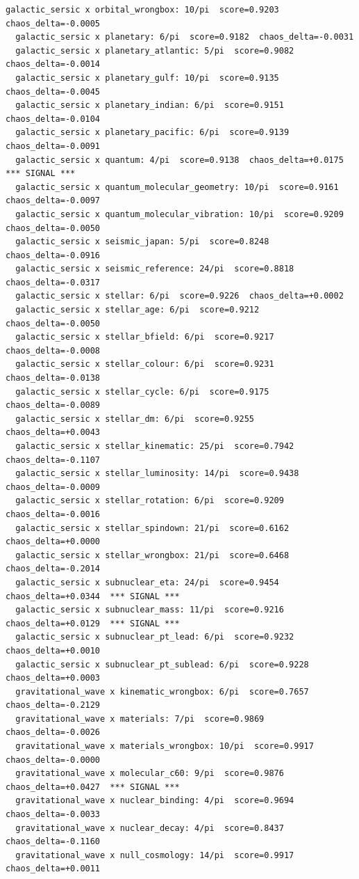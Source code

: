 \documentclass[11pt, letterpaper, openany]{book}
\begin{document}
\begin{empiricalbox}
\begin{lstlisting}[style=terminal]
  galactic_sersic x orbital_wrongbox: 10/pi  score=0.9203  chaos_delta=-0.0005
  galactic_sersic x planetary: 6/pi  score=0.9182  chaos_delta=-0.0031
  galactic_sersic x planetary_atlantic: 5/pi  score=0.9082  chaos_delta=-0.0014
  galactic_sersic x planetary_gulf: 10/pi  score=0.9135  chaos_delta=-0.0045
  galactic_sersic x planetary_indian: 6/pi  score=0.9151  chaos_delta=-0.0104
  galactic_sersic x planetary_pacific: 6/pi  score=0.9139  chaos_delta=-0.0091
  galactic_sersic x quantum: 4/pi  score=0.9138  chaos_delta=+0.0175  *** SIGNAL ***
  galactic_sersic x quantum_molecular_geometry: 10/pi  score=0.9161  chaos_delta=-0.0097
  galactic_sersic x quantum_molecular_vibration: 10/pi  score=0.9209  chaos_delta=-0.0050
  galactic_sersic x seismic_japan: 5/pi  score=0.8248  chaos_delta=-0.0916
  galactic_sersic x seismic_reference: 24/pi  score=0.8818  chaos_delta=-0.0317
  galactic_sersic x stellar: 6/pi  score=0.9226  chaos_delta=+0.0002
  galactic_sersic x stellar_age: 6/pi  score=0.9212  chaos_delta=-0.0050
  galactic_sersic x stellar_bfield: 6/pi  score=0.9217  chaos_delta=-0.0008
  galactic_sersic x stellar_colour: 6/pi  score=0.9231  chaos_delta=-0.0138
  galactic_sersic x stellar_cycle: 6/pi  score=0.9175  chaos_delta=-0.0089
  galactic_sersic x stellar_dm: 6/pi  score=0.9255  chaos_delta=+0.0043
  galactic_sersic x stellar_kinematic: 25/pi  score=0.7942  chaos_delta=-0.1107
  galactic_sersic x stellar_luminosity: 14/pi  score=0.9438  chaos_delta=-0.0009
  galactic_sersic x stellar_rotation: 6/pi  score=0.9209  chaos_delta=-0.0016
  galactic_sersic x stellar_spindown: 21/pi  score=0.6162  chaos_delta=+0.0000
  galactic_sersic x stellar_wrongbox: 21/pi  score=0.6468  chaos_delta=-0.2014
  galactic_sersic x subnuclear_eta: 24/pi  score=0.9454  chaos_delta=+0.0344  *** SIGNAL ***
  galactic_sersic x subnuclear_mass: 11/pi  score=0.9216  chaos_delta=+0.0129  *** SIGNAL ***
  galactic_sersic x subnuclear_pt_lead: 6/pi  score=0.9232  chaos_delta=+0.0010
  galactic_sersic x subnuclear_pt_sublead: 6/pi  score=0.9228  chaos_delta=+0.0003
  gravitational_wave x kinematic_wrongbox: 6/pi  score=0.7657  chaos_delta=-0.2129
  gravitational_wave x materials: 7/pi  score=0.9869  chaos_delta=-0.0026
  gravitational_wave x materials_wrongbox: 10/pi  score=0.9917  chaos_delta=-0.0000
  gravitational_wave x molecular_c60: 9/pi  score=0.9876  chaos_delta=+0.0427  *** SIGNAL ***
  gravitational_wave x nuclear_binding: 4/pi  score=0.9694  chaos_delta=-0.0033
  gravitational_wave x nuclear_decay: 4/pi  score=0.8437  chaos_delta=-0.1160
  gravitational_wave x null_cosmology: 14/pi  score=0.9917  chaos_delta=+0.0011

\end{lstlisting}
\end{empiricalbox}
\end{document}
